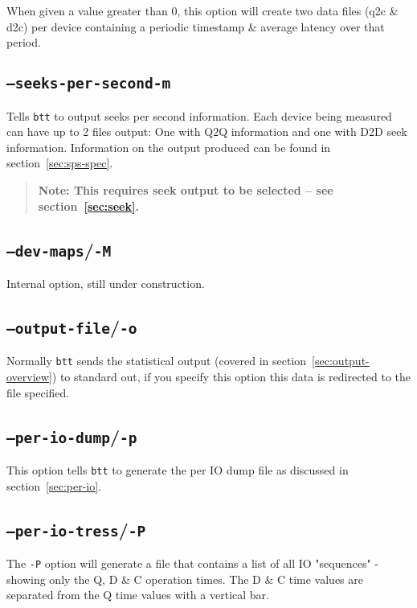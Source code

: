 \documentclass{article}
\begin{document}
  When given a value greater than 0, this option will create two data
  files (q2c \& d2c) per device containing a periodic timestamp \&
  average latency over that period.

\subsection{\label{sec:o-m}\texttt{--seeks-per-second}\texttt{-m}}

  Tells \texttt{btt} to output seeks per second information.  Each device
  being measured can have up to 2 files output: One with Q2Q information
  and one with D2D seek information. Information on the output produced
  can be found in section~\ref{sec:sps-spec}.

  \begin{quote}
    \textbf{Note: This requires seek output to be selected -- see
    section~\ref{sec:seek}.}
  \end{quote}

\subsection{\label{sec:o-M}\texttt{--dev-maps}/\texttt{-M}}

  Internal option, still under construction.

\subsection{\label{sec:o-o}\texttt{--output-file}/\texttt{-o}}

  Normally \texttt{btt} sends the statistical output (covered in
  section~\ref{sec:output-overview}) to standard out, if you specify
  this option this data is redirected to the file specified.

\subsection{\label{sec:o-p}\texttt{--per-io-dump}/\texttt{-p}}

  This option tells \texttt{btt} to generate the per IO dump file as
  discussed in section~\ref{sec:per-io}.

\subsection{\label{sec:o-P}\texttt{--per-io-tress}/\texttt{-P}}

The \texttt{-P} option will generate a file that contains a list of all IO
"sequences" - showing only the Q, D \& C operation times. The D \& C
time values are separated from the Q time values with a vertical bar.
\end{document}
